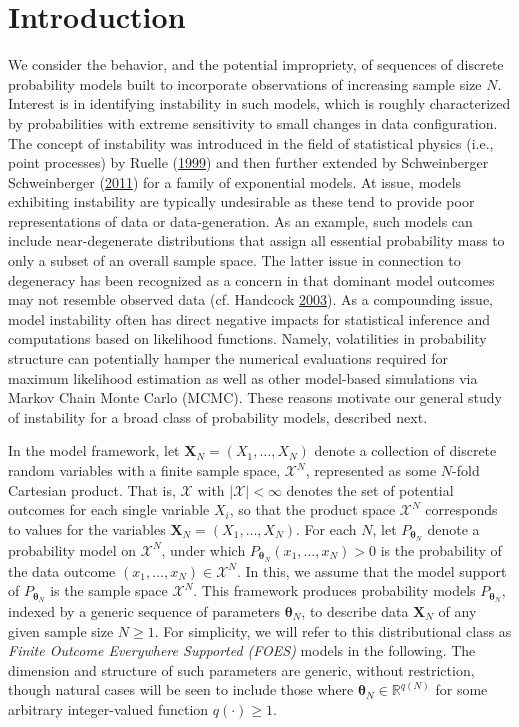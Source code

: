 \documentclass[]{article}
\theoremstyle{definition}
\begin{document}
\section{Introduction}\label{introduction}

We consider the behavior, and the potential impropriety, of sequences of
discrete probability models built to incorporate observations of
increasing sample size \(N\). Interest is in identifying instability in
such models, which is roughly characterized by probabilities with
extreme sensitivity to small changes in data configuration. The concept
of instability was introduced in the field of statistical physics (i.e.,
point processes) by Ruelle
(\protect\hyperlink{ref-ruelle1999statistical}{1999}) and then further
extended by Schweinberger Schweinberger
(\protect\hyperlink{ref-schweinberger2011instability}{2011}) for a
family of exponential models. At issue, models exhibiting instability
are typically undesirable as these tend to provide poor representations
of data or data-generation. As an example, such models can include
near-degenerate distributions that assign all essential probability mass
to only a subset of an overall sample space. The latter issue in
connection to degeneracy has been recognized as a concern in that
dominant model outcomes may not resemble observed data (cf. Handcock
\protect\hyperlink{ref-handcock2003assessing}{2003}). As a compounding
issue, model instability often has direct negative impacts for
statistical inference and computations based on likelihood functions.
Namely, volatilities in probability structure can potentially hamper the
numerical evaluations required for maximum likelihood estimation as well
as other model-based simulations via Markov Chain Monte Carlo (MCMC).
These reasons motivate our general study of instability for a broad
class of probability models, described next.

In the model framework, let \(\boldsymbol X_N = (X_1, \dots, X_N)\)
denote a collection of discrete random variables with a finite sample
space, \(\mathcal{X}^N\), represented as some \(N\)-fold Cartesian
product. That is, \(\mathcal{X}\) with \(|\mathcal{X}| < \infty\)
denotes the set of potential outcomes for each single variable \(X_i\),
so that the product space \(\mathcal{X}^N\) corresponds to values for
the variables \(\boldsymbol X_N=(X_1,\ldots,X_N)\). For each \(N\), let
\(P_{\boldsymbol \theta_N}\) denote a probability model on
\(\mathcal{X}^N\), under which
\(P_{\boldsymbol \theta_N}(x_1, \dots, x_N) > 0\) is the probability of
the data outcome \((x_1, \dots, x_N) \in \mathcal{X}^N\). In this, we
assume that the model support of \(P_{\boldsymbol \theta_N}\) is the
sample space \(\mathcal{X}^N\). This framework produces probability
models \(P_{\boldsymbol \theta_N}\), indexed by a generic sequence of
parameters \(\boldsymbol \theta_N\), to describe data
\(\boldsymbol X_N\) of any given sample size \(N \geq 1\). For
simplicity, we will refer to this distributional class as \emph{Finite
Outcome Everywhere Supported (FOES)} models in the following. The
dimension and structure of such parameters are generic, without
restriction, though natural cases will be seen to include those where
\(\boldsymbol \theta_N \in \mathbb{R}^{q(N)}\) for some arbitrary
integer-valued function \(q(\cdot) \geq 1\).
\end{document}
